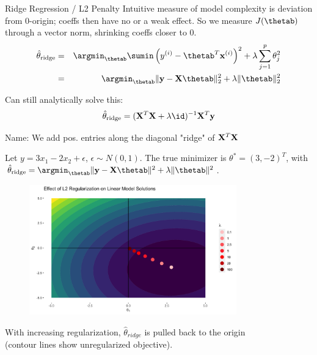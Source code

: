 \documentclass[11pt,compress,t,notes=noshow, xcolor=table]{beamer}
\begin{document}
\begin{vbframe}{Ridge Regression / L2 Penalty}
Intuitive measure of model complexity is deviation from 0-origin; coeffs then have no or a weak effect. 
So we measure $J(\thetab)$ through a vector norm, shrinking coeffs closer to 0.\\
\vspace{0.2cm}
\begin{eqnarray*}  
\thetah_{\text{ridge}} &=& \argmin_{\thetab} \sumin \left(\yi - \thetab^T \xi \right)^2 + \lambda \sum_{j=1}^{p} \theta_j^2 \\
&=& \argmin_{\thetab} \| \yv - \Xmat \thetab \|_2^2  + \lambda \|\thetab\|_2^2
\end{eqnarray*}

Can still analytically solve this:
$$\thetah_{\text{ridge}} = ({\Xmat}^T \Xmat  + \lambda \id)^{-1} \Xmat^T\yv$$

Name: We add pos. entries along the diagonal "ridge" of $\mathbf{X}^T \mathbf{X}$

\framebreak 

Let $y=3x_{1} -2x_{2} +\epsilon $, $ \epsilon \sim N( 0,1)$. The true minimizer is $\theta ^{*} =( 3,-2)^{T}$, with $ \thetah_{\text{ridge}} = \argmin_{\thetab} \|\yv - \Xmat \thetab\|^2 + \lambda \|\thetab\|^2 $.

\begin{figure}
\includegraphics[width=0.8\textwidth]{figure/lin_reg_l2.png}
\end{figure}
\vspace{-0.2cm}
{\small With increasing regularization, $\hat{\theta}_{\textit{ridge}}$ is pulled back to the origin\\ (contour lines show unregularized objective).}


\end{vbframe}
\end{document}

